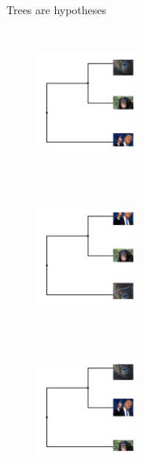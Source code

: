 \documentclass[newPxFont,numfooter,sectionpages]{beamer}
\begin{document}
\begin{frame}{Trees are hypotheses}
\begin{figure}
	\centerline{
	\includegraphics[width=0.3\textwidth,height=5cm]{figures/primate_tree_wrong1.pdf} \\ 
	\hspace{3em}
	\includegraphics[width=0.3\textwidth,height=5cm]{figures/primate_tree_correct.pdf}\\
	\hspace{3em}
	\includegraphics[width=0.3\textwidth,height=5cm]{figures/primate_tree_wrong2.pdf}
	}
\end{figure}
\end{frame}
\end{document}
